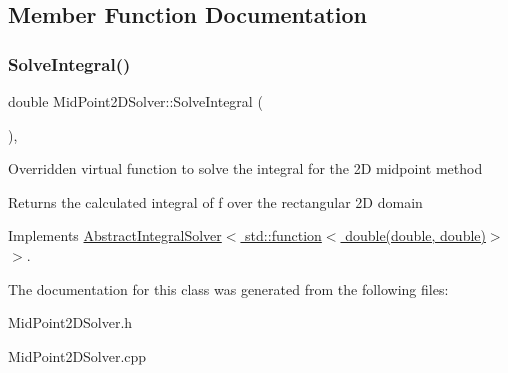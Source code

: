 \subsection{Member Function Documentation}
\mbox{\label{class_mid_point2_d_solver_a45c6c6802b7d40c35f1f60f1a39f5042}} 
\subsubsection{\texorpdfstring{Solve\+Integral()}{SolveIntegral()}}
{\footnotesize\ttfamily double Mid\+Point2\+D\+Solver\+::\+Solve\+Integral (\begin{DoxyParamCaption}{ }\end{DoxyParamCaption})\hspace{0.3cm}{\ttfamily [override]}, {\ttfamily [virtual]}}

Overridden virtual function to solve the integral for the 2D midpoint method \begin{DoxyReturn}{Returns}
the calculated integral of f over the rectangular 2D domain 
\end{DoxyReturn}


Implements \hyperlink{class_abstract_integral_solver}{Abstract\+Integral\+Solver$<$ std\+::function$<$ double(double, double)$>$ $>$}.



The documentation for this class was generated from the following files\+:\begin{DoxyCompactItemize}
\item 
Mid\+Point2\+D\+Solver.\+h\item 
Mid\+Point2\+D\+Solver.\+cpp\end{DoxyCompactItemize}
